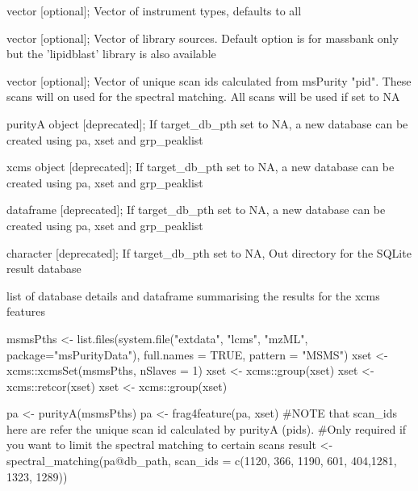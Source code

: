 \documentclass[letterpaper]{book}
\begin{document}
\begin{Arguments}
\begin{ldescription}
\item[\code{instrument\_types}] vector [optional]; Vector of instrument types, defaults to all

\item[\code{library\_sources}] vector [optional]; Vector of library sources. Default option is for massbank only but the 'lipidblast'
library is also available

\item[\code{scan\_ids}] vector [optional]; Vector of unique scan ids calculated from msPurity "pid". These scans will on
used for the spectral matching. All scans will be used if set to NA

\item[\code{pa}] purityA object [deprecated]; If target\_db\_pth set to NA, a new database can be created using pa, xset and grp\_peaklist

\item[\code{xset}] xcms object [deprecated]; If target\_db\_pth set to NA, a new database can be created using pa, xset and grp\_peaklist

\item[\code{grp\_peaklist}] dataframe [deprecated]; If target\_db\_pth set to NA, a new database can be created using pa, xset and grp\_peaklist

\item[\code{out\_dir}] character [deprecated]; If target\_db\_pth set to NA, Out directory for the SQLite result database
\end{ldescription}
\end{Arguments}
%
\begin{Value}
list of database details and dataframe summarising the results for the xcms features
\end{Value}
%
\begin{Examples}
\begin{ExampleCode}
msmsPths <- list.files(system.file("extdata", "lcms", "mzML", package="msPurityData"), full.names = TRUE, pattern = "MSMS")
xset <- xcms::xcmsSet(msmsPths, nSlaves = 1)
xset <- xcms::group(xset)
xset <- xcms::retcor(xset)
xset <- xcms::group(xset)

pa  <- purityA(msmsPths)
pa <- frag4feature(pa, xset)
#NOTE that scan_ids here are refer the unique scan id calculated by purityA (pids).
#Only required if you want to limit the spectral matching to certain scans
result <- spectral_matching(pa@db_path, scan_ids = c(1120,  366, 1190, 601,  404,1281, 1323, 1289))
\end{ExampleCode}
\end{Examples}
\end{document}
